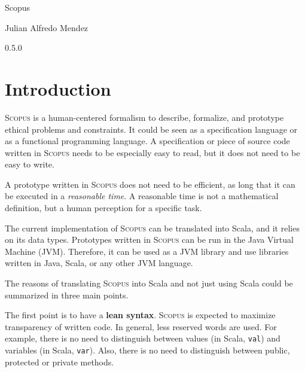 \documentclass[12pt,a4paper]{book}
\newcommand{\srccode}[1]{\texttt{{#1}}}
\newcommand{\reservedWord}[1]{{\color{blue}\srccode{#1}}\xspace}
\newcommand{\scalaval}{\reservedWord{val}}
\newcommand{\scalavar}{\reservedWord{var}}
\newcommand{\Scopus}{\textsc{Scopus}\xspace}
\begin{document}

    \begin{center}

        \phantom{H}

        \vspace{80mm}

        {\huge{Scopus}}

        \vspace{80mm}
        Julian Alfredo Mendez

        \vspace{10mm}
        0.5.0

    \end{center}

    \newpage


    \chapter{Introduction}

    \Scopus is a human-centered formalism to describe, formalize, and prototype ethical problems and constraints.
    It could be seen as a specification language or as a functional programming language.
    A specification or piece of source code written in \Scopus needs to be especially easy to read, but it does not need to be easy to write.

    A prototype written in \Scopus does not need to be efficient, as long that it can be executed in a \textit{reasonable time}.
    A reasonable time is not a mathematical definition, but a human perception for a specific task.

    The current implementation of \Scopus can be translated into Scala, and it relies on its data types.
    Prototypes written in \Scopus can be run in the Java Virtual Machine (JVM).
    Therefore, it can be used as a JVM library and use libraries written in Java, Scala, or any other JVM language.

    The reasons of translating \Scopus into Scala and not just using Scala could be summarized in three main points.

    The first point is to have a \textbf{lean syntax}.
    \Scopus is expected to maximize transparency of written code.
    In general, less reserved words are used.
    For example, there is no need to distinguish between values (in Scala, \scalaval) and variables (in Scala, \scalavar).
    Also, there is no need to distinguish between public, protected or private methods.
\end{document}
